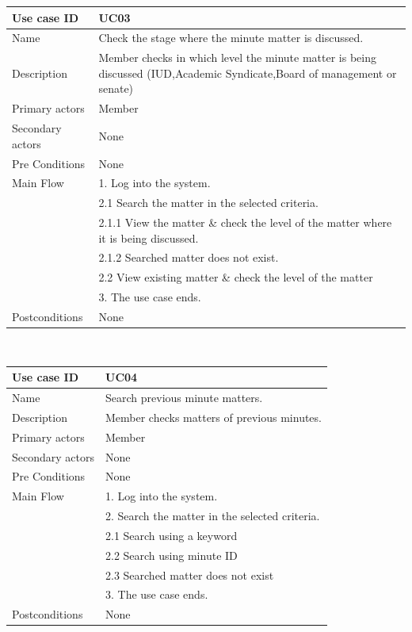 \documentclass[a4paper,beamer]{article}
\begin{document}
			\begin{tabular}{|p{4cm}|p{8cm}|} \hline 
					\textbf{Use case ID} & \textbf{UC03}  \\ \hline
					Name & Check the stage where the minute matter is discussed. \\ \hline 
					Description & Member checks in which level the minute matter is being discussed (IUD,Academic Syndicate,Board of management or senate) \\ \hline 
					Primary actors & Member \\ \hline 
					Secondary actors & None \\ \hline 
					Pre Conditions & None \\ \hline
					Main Flow & 1. Log into the system. \\
										& 2.1 Search the matter in the selected criteria.\\
										& 2.1.1 View the matter \& check the level of the matter where it is being discussed. \\
										& 2.1.2 Searched matter does not exist. \\
										& 2.2 View existing matter \& check the level of the matter\\
										& 3. The use case ends.\\ \hline
					Postconditions & None \\ \hline 
			\end{tabular} \\[.6cm]
				
			\begin{tabular}{|p{4cm}|p{8cm}|} \hline 
					\textbf{Use case ID} & \textbf{UC04}  \\ \hline
					Name & Search previous minute matters.\\ \hline 
					Description & Member checks  matters of previous minutes.\\ \hline 
					Primary actors & Member \\ \hline 
					Secondary actors & None \\ \hline 
					Pre Conditions & None \\ \hline
					Main Flow & 1. Log into the system.\\
							& 2. Search the matter in the selected criteria.\\ 
							& 2.1  Search using a keyword \\
							& 2.2  Search  using minute ID\\
							& 2.3  Searched matter does not exist\\
							& 3. The use case ends.\\ \hline
					Postconditions & None \\ \hline 
			\end{tabular} \\[.6cm]
			
\end{document}
